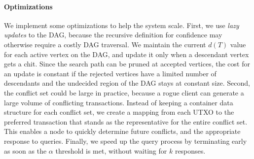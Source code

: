 \documentclass[letterpaper,twocolumn,10pt]{article}
\newcommand{\tronly}[2]{#1}
\theoremstyle{definition}
\begin{document}
%
%
%

\paragraph{Optimizations}
We implement some optimizations to help the system scale.
First, we use \emph{lazy updates} to the DAG, because the recursive definition for confidence may otherwise require a costly DAG traversal.
We maintain the current $d(T)$ value for each active vertex on the DAG, and update it only when a descendant vertex gets a chit.
Since the search path can be pruned at accepted vertices, the cost for an update is constant if the rejected vertices have a limited number of descendants and the undecided region of
the DAG stays at constant size.
Second, the conflict set could be large in practice, because a rogue client can generate a large volume of conflicting transactions.
Instead of keeping a container data structure for each conflict set, we create a mapping from each UTXO to the preferred transaction that stands as the representative for the entire conflict set.
This enables a node to quickly determine future conflicts, and the appropriate response to queries.
Finally, we speed up the query process by terminating early as soon as the $\alpha$ threshold is met, without waiting for $k$ responses.
\end{document}
